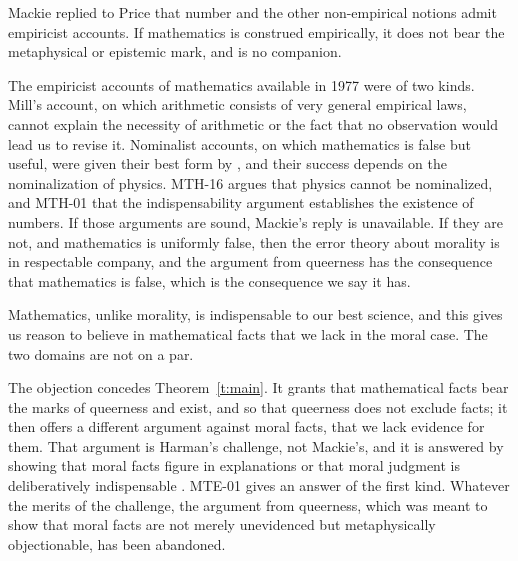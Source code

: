 \documentclass{situationist-preprint}
\begin{document}
\begin{objection}
Mackie replied to Price that number and the other non-empirical notions admit empiricist accounts. If mathematics is construed empirically, it does not bear the metaphysical or epistemic mark, and is no companion.
\end{objection}

\begin{reply}
The empiricist accounts of mathematics available in 1977 were of two kinds. Mill's account, on which arithmetic consists of very general empirical laws, cannot explain the necessity of arithmetic or the fact that no observation would lead us to revise it. Nominalist accounts, on which mathematics is false but useful, were given their best form by \citet{Field1980}, and their success depends on the nominalization of physics. MTH-16 argues that physics cannot be nominalized, and MTH-01 that the indispensability argument establishes the existence of numbers. If those arguments are sound, Mackie's reply is unavailable. If they are not, and mathematics is uniformly false, then the error theory about morality is in respectable company, and the argument from queerness has the consequence that mathematics is false, which is the consequence we say it has.
\end{reply}

\begin{objection}[Indispensability]
Mathematics, unlike morality, is indispensable to our best science, and this gives us reason to believe in mathematical facts that we lack in the moral case. The two domains are not on a par.
\end{objection}

\begin{reply}
The objection concedes Theorem~\ref{t:main}. It grants that mathematical facts bear the marks of queerness and exist, and so that queerness does not exclude facts; it then offers a different argument against moral facts, that we lack evidence for them. That argument is Harman's challenge, not Mackie's, and it is answered by showing that moral facts figure in explanations \citep{Sturgeon1985} or that moral judgment is deliberatively indispensable \citep{Enoch2011}. MTE-01 gives an answer of the first kind. Whatever the merits of the challenge, the argument from queerness, which was meant to show that moral facts are not merely unevidenced but metaphysically objectionable, has been abandoned.
\end{reply}
\end{document}
